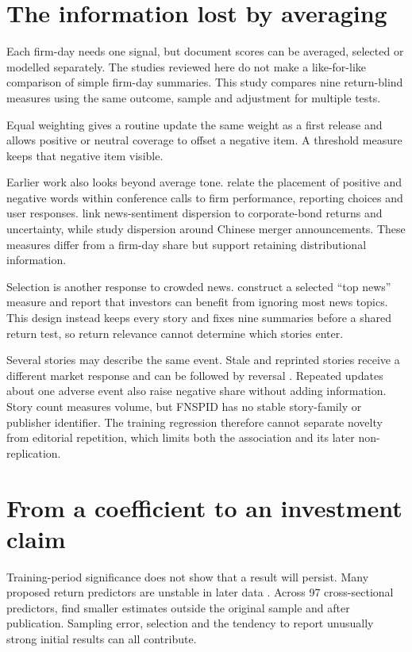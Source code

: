 \section{The information lost by averaging}

Each firm-day needs one signal, but document scores can be averaged, selected or
modelled separately. The studies reviewed here do not make a like-for-like
comparison of simple firm-day summaries. This study compares nine return-blind
measures using the same outcome, sample and adjustment for multiple tests.

Equal weighting gives a routine update the same weight as a first release and
allows positive or neutral coverage to offset a negative item. A threshold
measure keeps that negative item visible.

Earlier work also looks beyond average tone. \citet{allee2015} relate the
placement of positive and negative words within conference calls to firm
performance, reporting choices and user responses. \citet{isakin2023} link
news-sentiment dispersion to corporate-bond returns and uncertainty, while
\citet{chen2024} study dispersion around Chinese merger announcements. These
measures differ from a firm-day share but support retaining distributional
information.

Selection is another response to crowded news. \citet{uhl2021} construct a
selected ``top news'' measure and report that investors can benefit from
ignoring most news topics. This design instead keeps every story and fixes nine
summaries before a shared return test, so return relevance cannot determine
which stories enter.

Several stories may describe the same event. Stale and reprinted stories receive
a different market response and can be followed by reversal
\citep{tetlock2011stale}. Repeated updates about one adverse event also raise
negative share without adding information. Story count measures volume, but
FNSPID has no stable story-family or publisher identifier. The training
regression therefore cannot separate novelty from editorial repetition, which
limits both the association and its later non-replication.

\section{From a coefficient to an investment claim}

Training-period significance does not show that a result will persist. Many
proposed return predictors are unstable in later data \citep{welch2008}. Across
97 cross-sectional predictors, \citet{mclean2016} find smaller estimates outside
the original sample and after publication. Sampling error, selection and the
tendency to report unusually strong initial results can all contribute.

